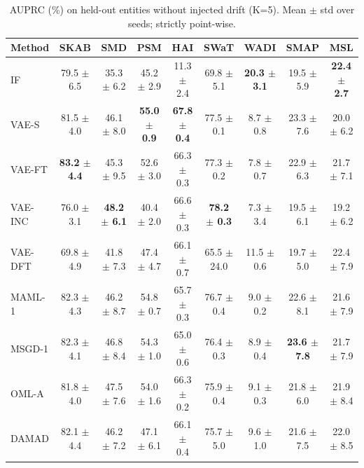 \begin{table}[t]
\centering
\small
\caption{AUPRC (\%) on held-out entities without injected drift (K=5). Mean $\pm$ std over seeds; strictly point-wise.}
\label{tab:cold_auprc}
\begin{tabular}{lcccccccc}
\toprule
Method & SKAB & SMD & PSM & HAI & SWaT & WADI & SMAP & MSL \\
\midrule
IF & 79.5 $\pm$ 6.5 & 35.3 $\pm$ 6.2 & 45.2 $\pm$ 2.9 & 11.3 $\pm$ 2.4 & 69.8 $\pm$ 5.1 & \textbf{20.3 $\pm$ 3.1} & 19.5 $\pm$ 5.9 & \textbf{22.4 $\pm$ 2.7} \\
VAE-S & 81.5 $\pm$ 4.0 & 46.1 $\pm$ 8.0 & \textbf{55.0 $\pm$ 0.9} & \textbf{67.8 $\pm$ 0.4} & 77.5 $\pm$ 0.1 & 8.7 $\pm$ 0.8 & 23.3 $\pm$ 7.6 & 20.0 $\pm$ 6.2 \\
VAE-FT & \textbf{83.2 $\pm$ 4.4} & 45.3 $\pm$ 9.5 & 52.6 $\pm$ 3.0 & 66.3 $\pm$ 0.3 & 77.3 $\pm$ 0.2 & 7.8 $\pm$ 0.7 & 22.9 $\pm$ 6.3 & 21.7 $\pm$ 7.1 \\
VAE-INC & 76.0 $\pm$ 3.1 & \textbf{48.2 $\pm$ 6.1} & 40.4 $\pm$ 2.0 & 66.6 $\pm$ 0.3 & \textbf{78.2 $\pm$ 0.3} & 7.3 $\pm$ 3.4 & 19.5 $\pm$ 6.1 & 19.2 $\pm$ 6.2 \\
VAE-DFT & 69.8 $\pm$ 4.9 & 41.8 $\pm$ 7.3 & 47.4 $\pm$ 4.7 & 66.1 $\pm$ 0.7 & 65.5 $\pm$ 24.0 & 11.5 $\pm$ 0.6 & 19.7 $\pm$ 5.0 & 22.4 $\pm$ 7.9 \\
MAML-1 & 82.3 $\pm$ 4.3 & 46.2 $\pm$ 8.7 & 54.8 $\pm$ 0.7 & 65.7 $\pm$ 0.3 & 76.7 $\pm$ 0.4 & 9.0 $\pm$ 0.2 & 22.6 $\pm$ 8.1 & 21.6 $\pm$ 7.9 \\
MSGD-1 & 82.3 $\pm$ 4.1 & 46.8 $\pm$ 8.4 & 54.3 $\pm$ 1.0 & 65.0 $\pm$ 0.6 & 76.4 $\pm$ 0.3 & 8.9 $\pm$ 0.4 & \textbf{23.6 $\pm$ 7.8} & 21.7 $\pm$ 7.9 \\
OML-A & 81.8 $\pm$ 4.0 & 47.5 $\pm$ 7.6 & 54.0 $\pm$ 1.6 & 66.3 $\pm$ 0.2 & 75.9 $\pm$ 0.4 & 9.1 $\pm$ 0.3 & 21.8 $\pm$ 6.0 & 21.9 $\pm$ 8.4 \\
DAMAD & 82.1 $\pm$ 4.4 & 46.2 $\pm$ 7.2 & 47.1 $\pm$ 6.1 & 66.1 $\pm$ 0.4 & 75.7 $\pm$ 5.0 & 9.6 $\pm$ 1.0 & 21.6 $\pm$ 7.5 & 22.0 $\pm$ 8.5 \\
\bottomrule
\end{tabular}
\end{table}

